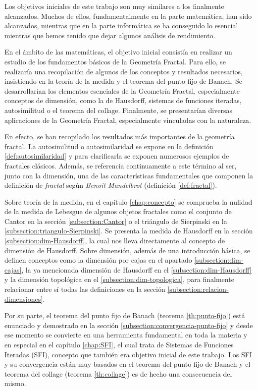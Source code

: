Los objetivos iniciales de este trabajo son muy similares a los finalmente alcanzados. Muchos de ellos, fundamentalmente en la parte matemática, han sido alcanzados, mientras que en la parte informática se ha conseguido lo esencial mientras que hemos tenido que dejar algunos análisis de rendimiento. 

En el ámbito de las matemáticas, el objetivo inicial consistía en realizar un estudio de los fundamentos básicos de la Geometría Fractal. Para ello, se realizaría una recopilación de algunos de los conceptos y resultados necesarios, insistiendo en la teoría de la medida y el teorema del punto fijo de Banach. Se desarrollarían los elementos esenciales de la Geometría Fractal, especialmente conceptos de dimensión, como la de Hausdorff, sistemas de funciones iteradas, autosimilitud o el teorema del collage. Finalmente, se presentarían diversas aplicaciones de la Geometría Fractal, especialmente vinculadas con la naturaleza.

En efecto, se han recopilado los resultados más importantes de la geometría fractal. La autosimilitud o autosimilaridad se expone en la definición \ref{def:autosimilaridad} y para clarificarla se exponen numerosos ejemplos de fractales clásicos. Además, se referencia continuamente a este término al ser, junto con la dimensión, una de las características fundamentales que componen la definición de \textit{fractal} según \textit{Benoit Mandelbrot} (definición \ref{def:fractal}).

Sobre teoría de la medida, en el capítulo \ref{chap:concepto} se comprueba la nulidad de la medida de Lebesgue de algunos objetos fractales como el conjunto de Cantor en la sección \ref{subsection:Cantor} o el triángulo de Sierpinski en la \ref{subsection:triangulo-Sierpinski}. Se presenta la medida de Hausdorff en la sección \ref{subsection:dim-Hausdorff}, la cual nos lleva directamente al concepto de dimensión de Hausdorff. Sobre dimensión, además de una introducción básica, se definen conceptos como la dimensión por cajas en el apartado \ref{subsection:dim-cajas}, la ya mencionada dimensión de Hausdorff en el \ref{subsection:dim-Hausdorff} y la dimensión topológica en el \ref{subsection:dim-topologica}, para finalmente relacionar entre sí todas las definiciones en la sección \ref{subsection:relacion-dimensiones}. 

Por su parte, el teorema del punto fijo de Banach (teorema \ref{th:punto-fijo}) está enunciado y demostrado en la sección \ref{subsection:convergencia-punto-fijo} y desde ese momento se convierte en una herramienta fundamental en toda la materia y en especial en el capítulo \ref{chap:SFI}, el cual trata de Sistemas de Funciones Iteradas (SFI), concepto que también era objetivo inicial de este trabajo. Los SFI y su convergencia están muy basados en el teorema del punto fijo de Banach y el teorema del collage (teorema \ref{th:collage}) es de hecho una consecuencia del mismo.

